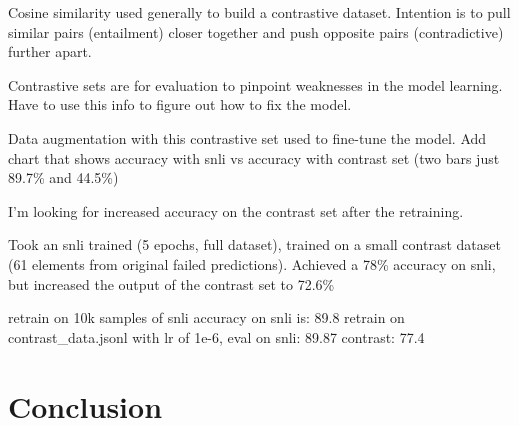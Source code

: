 \documentclass[11pt]{article}
\begin{document}
Cosine similarity used generally to build a contrastive dataset. Intention is to pull similar pairs (entailment) closer together and push opposite pairs (contradictive) further apart.

Contrastive sets are for evaluation to pinpoint weaknesses in the model learning. Have to use this info to figure out how to fix the model.

Data augmentation with this contrastive set used to fine-tune the model.
Add chart that shows accuracy with snli vs accuracy with contrast set (two bars just 89.7\% and 44.5\%)

I'm looking for increased accuracy on the contrast set after the retraining.

Took an snli trained (5 epochs, full dataset), trained on a small contrast dataset (61 elements from original failed predictions).  Achieved a 78\% accuracy on snli, but increased the output of the contrast set to 72.6\%

retrain on 10k samples of snli accuracy on snli is: 89.8
retrain on contrast_data.jsonl with lr of 1e-6, eval on snli: 89.87  contrast: 77.4

\section{Conclusion}



\end{document}
